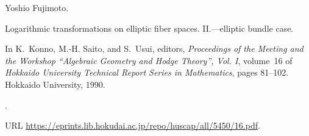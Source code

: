 Yoshio Fujimoto.

\newblock Logarithmic transformations on elliptic fiber spaces. II.---elliptic bundle case.

\newblock In K.~Konno, M.-H. Saito, and S.~Usui, editors, \emph{Proceedings of
  the Meeting and the Workshop ``Algebraic Geometry and Hodge Theory'', Vol.
  I}, volume~16 of \emph{Hokkaido University Technical Report Series in
  Mathematics}, pages 81--102. Hokkaido University, 1990.

\newblock {}.

\newblock URL
  \url{https://eprints.lib.hokudai.ac.jp/repo/huscap/all/5450/16.pdf}.
